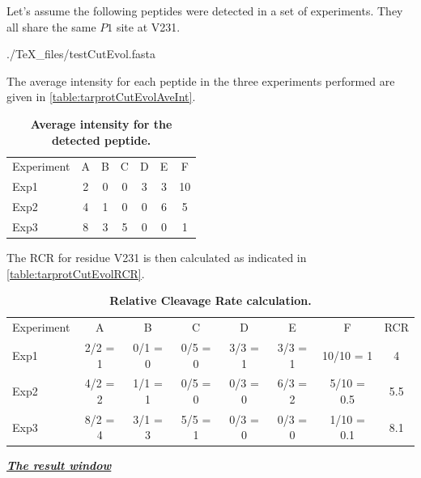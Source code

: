 Let's assume the following peptides were detected in a set of experiments. They all
share the same \(P1\) site at V231.

\begin{texshade}{./TeX_files/testCutEvol.fasta}
    \hideconsensus
\end{texshade}

The average intensity for each peptide in the three experiments performed are given
in \autoref{table:tarprotCutEvolAveInt}.

\begin{table}[h!]
    \centering
    \begin{tabular}{lcccccc}
        \hline
        Experiment & A & B & C & D & E & F \\
        Exp1 & 2 & 0 & 0 & 3 & 3 & 10 \\
        Exp2 & 4 & 1 & 0 & 0 & 6 & 5 \\
        Exp3 & 8 & 3 & 5 & 0 & 0 & 1 \\
        \hline
    \end{tabular}
    \caption[Average intensity for the detected peptide]{\textbf{Average intensity
    for the detected peptide.}}
    \label{table:tarprotCutEvolAveInt}
\end{table}

The RCR for residue V231 is then calculated as indicated in \autoref{table:tarprotCutEvolRCR}.

\begin{table}[h!]
    \centering
    \begin{tabular}{lccccccc}
        \hline
        Experiment & A       & B       & C       & D       & E       & F          & RCR\\
        Exp1       & 2/2 = 1 & 0/1 = 0 & 0/5 = 0 & 3/3 = 1 & 3/3 = 1 & 10/10 = 1  & 4  \\
        Exp2       & 4/2 = 2 & 1/1 = 1 & 0/5 = 0 & 0/3 = 0 & 6/3 = 2 & 5/10 = 0.5 & 5.5\\
        Exp3       & 8/2 = 4 & 3/1 = 3 & 5/5 = 1 & 0/3 = 0 & 0/3 = 0 & 1/10 = 0.1 & 8.1\\
        \hline
    \end{tabular}
    \caption[Relative Cleavage Rate calculation]{\textbf{Relative Cleavage Rate
    calculation.}}
    \label{table:tarprotCutEvolRCR}
\end{table}

\textit{\textbf{\underline{The result window}}}

